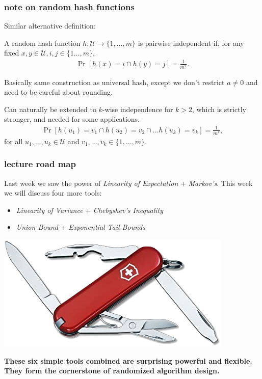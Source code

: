 \documentclass[handout,compress]{beamer}
\begin{document}
\begin{frame}[t]
	\frametitle{note on random hash functions}
Similar alternative definition:
	\begin{definition}
		A random hash function $h: \mathcal{U} \rightarrow \{1, \ldots, m\}$ is pairwise independent if, for any fixed $x,y\in \mathcal{U}, i,j \in \{1\ldots, m\}$,
		\begin{align*}
			\Pr[h(x) = i \cap h(y) = j] = \frac{1}{m^2}.
		\end{align*}
	\end{definition}
\vspace{-1em}
Basically same construction as universal hash, except we don't restrict $a \neq 0$ and need to be careful about rounding.

	Can naturally be extended to $k$-wise independence for $k > 2$, which is strictly stronger, and needed for some applications. 
	\begin{align*}
		\Pr[h(u_1) = v_1 \cap h(u_2) = v_2 \cap \ldots h(u_k) = v_k] = \frac{1}{m^k}, 
	\end{align*}
for all $u_1, \ldots, u_k \in \mathcal{U}$ and $v_1, \ldots, v_k \in \{1, \ldots, m\}$.
\end{frame}

\begin{frame}
	\frametitle{lecture road map}
	Last week we saw the power of \emph{Linearity of Expectation} + \emph{Markov's}. This week we will discuss four more tools:
	\begin{itemize}
		\item \emph{Linearity of Variance} + \emph{Chebyshev's Inequality}
		\item \emph{Union Bound} + \emph{Exponential Tail Bounds}
	\end{itemize}
	\begin{center}
		\includegraphics[width=.5\textwidth]{4function.png}
		
		\textbf{\alert{These six simple tools combined are surprising powerful and flexible. They form the cornerstone of randomized algorithm design.}}
	\end{center}
 \end{frame}
\end{document}
